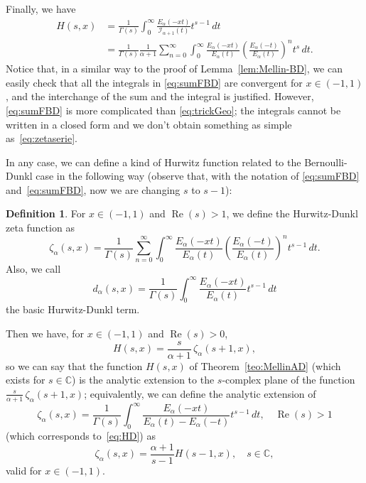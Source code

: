 \documentclass[a4paper]{amsart}
\newcommand{\C}{\mathbb{C}}
\newcommand{\I}{\mathcal{I}}
\newcommand{\Ea}{E_{\alpha}}
\renewcommand{\Re}{\operatorname{Re}}
\theoremstyle{plain}
\theoremstyle{definition}
\newtheorem{definition}[theorem]{Definition}
\theoremstyle{remark}
\numberwithin{equation}{section}
\begin{document}
Finally, we have
\begin{equation}
\label{eq:sumFBD}
\begin{aligned}
H(s,x) & = \frac{1}{\Gamma(s)} \int_{0}^{\infty} 
\frac{\Ea(-xt)}{\I_{\alpha+1}(t)} t^{s-1} \,dt \\
& = \frac{1}{\Gamma(s)} \frac{1}{\alpha+1}
\sum_{n=0}^{\infty} \int_{0}^{\infty} \frac{\Ea(-xt)}{\Ea(t)}
\left(\frac{\Ea(-t)}{\Ea(t)}\right)^n t^{s} \,dt.
\end{aligned}
\end{equation}
Notice that, in a similar way to the proof of Lemma~\ref{lem:Mellin-BD}, we can easily check that all the integrals in \eqref{eq:sumFBD} are convergent for $x \in (-1,1)$, and the interchange of the sum and the integral is justified.
However, \eqref{eq:sumFBD} is more complicated than \eqref{eq:trickGeo}; the integrals cannot be written in a closed form and we don't obtain something as simple as~\eqref{eq:zetaserie}.

In any case, we can define a kind of Hurwitz function related to the Bernoulli-Dunkl case in the following way (observe that, with the notation of \eqref{eq:sumFBD} and~\eqref{eq:sumFBD}, now we are changing $s$ to $s-1$):

\begin{definition}
\label{def:HD-zeta}
For $x \in (-1, 1)$ and $\Re(s) > 1$, we define the Hurwitz-Dunkl zeta function as
\begin{equation}
\label{eq:HD}
\zeta_{\alpha}(s,x) = \frac{1}{\Gamma(s)} \sum_{n=0}^{\infty}
\int_{0}^{\infty} \frac{\Ea(-xt)}{\Ea(t)} \left(\frac{\Ea(-t)}{\Ea(t)}\right)^n t^{s-1} \,dt.
\end{equation}
Also, we call
\begin{equation}
\label{eq:sumandoHD}
d_{\alpha}(s,x) = \frac{1}{\Gamma(s)} \int_{0}^{\infty} \frac{\Ea(-xt)}{\Ea(t)} t^{s-1} \,dt
\end{equation}
the basic Hurwitz-Dunkl term.
\end{definition}

Then we have, for $x \in (-1, 1)$ and $\Re(s)>0$,
\begin{equation}
\label{eq:HtozetaBD}
H(s,x) = \frac{s}{\alpha+1} \,\zeta_{\alpha}(s+1,x),
\end{equation}
so we can say that the function $H(s,x)$ of Theorem~\ref{teo:MellinAD} (which exists for $s\in\C$) is the analytic extension to the $s$-complex plane 
of the function $\frac{s}{\alpha+1} \,\zeta_{\alpha}(s+1,x)$; 
equivalently, we can define the analytic extension of
\begin{equation}
\label{eq:HD-zeta1}
  \zeta_{\alpha}(s,x) =  \frac{1}{\Gamma(s)}
\int_{0}^{\infty} \frac{\Ea(-xt)}{\Ea(t)-\Ea(-t)} t^{s-1}\,dt, 
\quad \Re(s) > 1
\end{equation}
(which corresponds to~\eqref{eq:HD}) as
\begin{equation}
\label{eq:HD-zeta}
  \zeta_{\alpha}(s,x) = \frac{\alpha+1}{s-1} H(s-1,x),
  \quad s \in \C,
\end{equation}
valid for $x \in (-1,1)$. 
\end{document}
